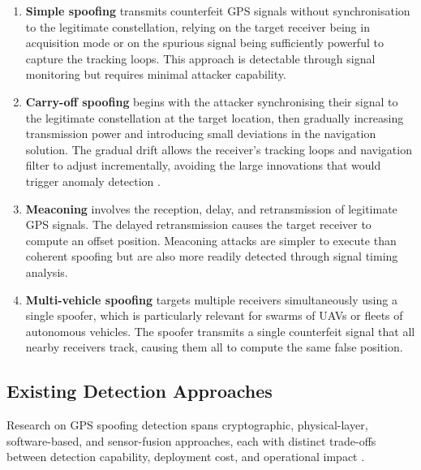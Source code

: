 \documentclass[electronics,article,accept,moreauthors]{Definitions/mdpi}
\begin{document}
\begin{enumerate}
    \item \textbf{Simple spoofing} transmits counterfeit GPS signals without synchronisation to the legitimate constellation, relying on the target receiver being in acquisition mode or on the spurious signal being sufficiently powerful to capture the tracking loops. This approach is detectable through signal monitoring but requires minimal attacker capability.
    
    \item \textbf{Carry-off spoofing} begins with the attacker synchronising their signal to the legitimate constellation at the target location, then gradually increasing transmission power and introducing small deviations in the navigation solution. The gradual drift allows the receiver's tracking loops and navigation filter to adjust incrementally, avoiding the large innovations that would trigger anomaly detection \citep{kerns2014,tippenhauer2011}.
    
    \item \textbf{Meaconing} involves the reception, delay, and retransmission of legitimate GPS signals. The delayed retransmission causes the target receiver to compute an offset position. Meaconing attacks are simpler to execute than coherent spoofing but are also more readily detected through signal timing analysis.
    
    \item \textbf{Multi-vehicle spoofing} targets multiple receivers simultaneously using a single spoofer, which is particularly relevant for swarms of UAVs or fleets of autonomous vehicles. The spoofer transmits a single counterfeit signal that all nearby receivers track, causing them all to compute the same false position.
\end{enumerate}

\subsection{Existing Detection Approaches}
\label{sec:detectionapproaches}

Research on GPS spoofing detection spans cryptographic, physical-layer, software-based, and sensor-fusion approaches, each with distinct trade-offs between detection capability, deployment cost, and operational impact \citep{psiaki2016,jafarnia2012}.
\end{document}
